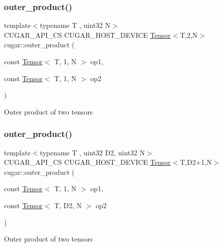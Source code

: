 \subsubsection{\texorpdfstring{outer\+\_\+product()}{outer\_product()}\hspace{0.1cm}{\footnotesize\ttfamily [7/9]}}
{\footnotesize\ttfamily template$<$typename T , uint32 N$>$ \\
C\+U\+G\+A\+R\+\_\+\+A\+P\+I\+\_\+\+CS C\+U\+G\+A\+R\+\_\+\+H\+O\+S\+T\+\_\+\+D\+E\+V\+I\+CE \hyperlink{structcugar_1_1_tensor}{Tensor}$<$T,2,N$>$ cugar\+::outer\+\_\+product (\begin{DoxyParamCaption}\item[{const \hyperlink{structcugar_1_1_tensor}{Tensor}$<$ T, 1, N $>$}]{op1,  }\item[{const \hyperlink{structcugar_1_1_tensor}{Tensor}$<$ T, 1, N $>$}]{op2 }\end{DoxyParamCaption})}

Outer product of two tensors \mbox{\label{namespacecugar_a0c5c7465eff221749960051d27c2d3a8}} 
\subsubsection{\texorpdfstring{outer\+\_\+product()}{outer\_product()}\hspace{0.1cm}{\footnotesize\ttfamily [8/9]}}
{\footnotesize\ttfamily template$<$typename T , uint32 D2, uint32 N$>$ \\
C\+U\+G\+A\+R\+\_\+\+A\+P\+I\+\_\+\+CS C\+U\+G\+A\+R\+\_\+\+H\+O\+S\+T\+\_\+\+D\+E\+V\+I\+CE \hyperlink{structcugar_1_1_tensor}{Tensor}$<$T,D2+1,N$>$ cugar\+::outer\+\_\+product (\begin{DoxyParamCaption}\item[{const \hyperlink{structcugar_1_1_tensor}{Tensor}$<$ T, 1, N $>$}]{op1,  }\item[{const \hyperlink{structcugar_1_1_tensor}{Tensor}$<$ T, D2, N $>$}]{op2 }\end{DoxyParamCaption})}

Outer product of two tensors \mbox{\label{namespacecugar_a420265d5c4604f1adb56935169b7a772}} 
